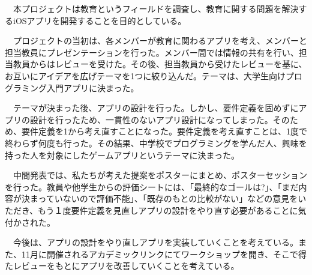 \documentclass[openany,11pt,papersize]{jsbook}
\newcounter{hoge}
\newcommand{\fake}[1]{\whiledo{\thehoge<70}{#1\stepcounter{hoge}}%
  \setcounter{hoge}{0}}
\begin{document}
%
\maketitle

\frontmatter

\begin{jabstract} 
　本プロジェクトは教育というフィールドを調査し、教育に関する問題を解決するiOSアプリを開発することを目的としている。

　プロジェクトの当初は、各メンバーが教育に関わるアプリを考え、メンバーと担当教員にプレゼンテーションを行った。メンバー間では情報の共有を行い、担当教員からはレビューを受けた。その後、担当教員から受けたレビューを基に、お互いにアイデアを広げテーマを1つに絞り込んだ。テーマは、大学生向けプログラミング入門アプリに決まった。

　テーマが決まった後、アプリの設計を行った。しかし、要件定義を固めずにアプリの設計を行ったため、一貫性のないアプリ設計になってしまった。そのため、要件定義を1から考え直すことになった。要件定義を考え直すことは、1度で終わらず何度も行った。その結果、中学校でプログラミングを学んだ人、興味を持った人を対象にしたゲームアプリというテーマに決まった。

　中間発表では、私たちが考えた提案をポスターにまとめ、ポスターセッションを行った。教員や他学生からの評価シートには、「最終的なゴールは?」、「まだ内容が決まっていないので評価不能」、「既存のもとの比較がない」などの意見をいただき、もう１度要件定義を見直しアプリの設計をやり直す必要があることに気付かされた。

　今後は、アプリの設計をやり直しアプリを実装していくことを考えている。また、11月に開催されるアカデミックリンクにてワークショップを開き、そこで得たレビューをもとにアプリを改善していくことを考えている。

\end{jabstract}
\end{document}
